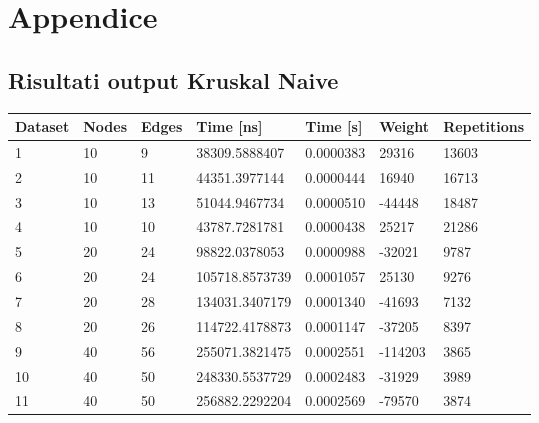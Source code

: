 \section{Appendice}

\subsection{Risultati output Kruskal Naive}

\begin{longtable}{lllllll}
    \textbf{Dataset} & \textbf{Nodes} & \textbf{Edges} & \textbf{Time [ns]}     & \textbf{Time [s]} & \textbf{Weight} & \textbf{Repetitions} \\
    \endhead
    1                & 10             & 9              & 38309.5888407         & 0.0000383        & 29316           & 13603                \\
    2                & 10             & 11             & 44351.3977144         & 0.0000444        & 16940           & 16713                \\
    3                & 10             & 13             & 51044.9467734         & 0.0000510        & -44448          & 18487                \\
    4                & 10             & 10             & 43787.7281781         & 0.0000438        & 25217           & 21286                \\
    5                & 20             & 24             & 98822.0378053         & 0.0000988        & -32021          & 9787                 \\
    6                & 20             & 24             & 105718.8573739        & 0.0001057        & 25130           & 9276                 \\
    7                & 20             & 28             & 134031.3407179        & 0.0001340        & -41693          & 7132                 \\
    8                & 20             & 26             & 114722.4178873        & 0.0001147        & -37205          & 8397                 \\
    9                & 40             & 56             & 255071.3821475        & 0.0002551        & -114203         & 3865                 \\
    10               & 40             & 50             & 248330.5537729        & 0.0002483        & -31929          & 3989                 \\
    11               & 40             & 50             & 256882.2292204        & 0.0002569        & -79570          & 3874                 \\

\end{longtable}
